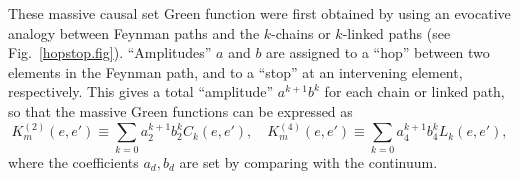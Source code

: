 These  massive causal set Green function were  first obtained by \cite{johnston,johnstonthesis} using an evocative  analogy between Feynman paths
and the $k$-chains or  $k$-linked paths (see Fig.~\ref{hopstop.fig}). ``Amplitudes'' $a$ and $b$ are  assigned to a  ``hop'' between two
elements in the Feynman path, and to a ``stop'' at an 
intervening element, respectively. This gives a total ``amplitude'' $a^{k+1}b^k$ for each
chain or linked path, so that the massive Green functions can be expressed as  
\begin{equation} 
K_m^{(2)}(e,e') \equiv \sum_{k=0} a_2^{k+1} b_2^{k} C_k(e,e'), \quad K_m^{(4)}(e,e') \equiv \sum_{k=0} a_4^{k+1} b_4^{k}
L_k(e,e'), 
\end{equation}   
where the coefficients $a_d,b_d$ are set by comparing with the continuum.
\begin{figure}[ht]

\end{figure}
